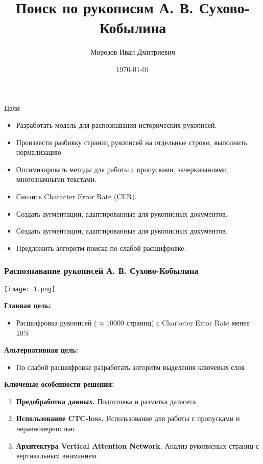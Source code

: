 \documentclass{beamer}
\title{Поиск по рукописям А. В. Сухово-Кобылина}
\author{Морозов Иван Дмитриевич}
\institute{ВМК МГУ имени М. В. Ломоносова}
\date{\today}
\begin{document}
\begin{frame}
    \titlepage
\end{frame}

\begin{frame}{Цели}
    \begin{itemize}
        \item Разработать модель для распознавания исторических рукописей.
        \item Произвести разбивку страниц рукописей на отдельные строки, выполнить нормализацию
        \item Оптимизировать методы для работы с пропусками, зачеркиваниями, многозначными текстами.
        \item Снизить Character Error Rate (CER).
        \item Создать аугментации, адаптированные для рукописных документов.
        \item Создать аугментации, адаптированные для рукописных документов.
        \item Предложить алгоритм поиска по слабой расшифровке.
    \end{itemize}
\end{frame}

\begin{frame}
    \frametitle{Распознавание  рукописей А. В. Сухово-Кобылина}
    
    \begin{minipage}{0.17\textwidth}
        \texttt{[image: 1.png]}
    \end{minipage}%
    \hfill
    \begin{minipage}{0.83\textwidth}
        \textbf{Главная цель:}
        \begin{itemize}
            \item Расшифровка рукописей ($\approx 10000$ страниц) с Character Error Rate менее 10\%
        \end{itemize}
        \textbf{Альтернативная цель:}
        \begin{itemize}
            \item По слабой расшифровке разработать алгоритм выделения ключевых слов
        \end{itemize}
        \vspace{0.5cm}
        \textbf{Ключевые особенности решения:}
        \begin{enumerate}
            \item \textbf{Предобработка данных.} Подготовка и разметка датасета.
            \item \textbf{Использование CTC-loss.} Использование для работы с пропусками и неравномерностью.
            \item \textbf{Архитектура Vertical Attention Network.} Анализ рукописных страниц с вертикальным вниманием.
        \end{enumerate}
    \end{minipage}
    
\end{frame}
\end{document}
